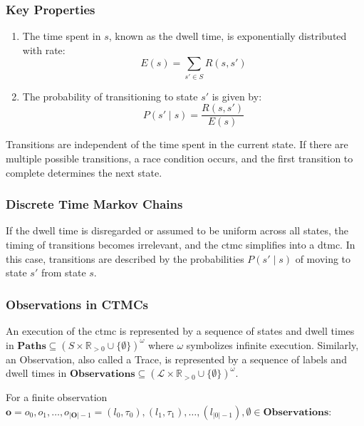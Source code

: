 \subsubsection{Key Properties}

\begin{enumerate}
    \item The time spent in $s$, known as the dwell time, is exponentially distributed with rate:
    \begin{equation}
        E(s) = \sum_{s' \in S} R(s, s')\label{eq:exitrate}
    \end{equation}
    \item The probability of transitioning to state $s'$ is given by:
    \begin{equation}
        P(s' \mid s) = \frac{R(s, s')}{E(s)}\label{eq:transition-probability}
    \end{equation}
\end{enumerate}


Transitions are independent of the time spent in the current state.
If there are multiple possible transitions, a race condition occurs, and the first transition to complete determines the next state.


\subsubsection{Discrete Time Markov Chains}
If the dwell time is disregarded or assumed to be uniform across all states, the timing of transitions becomes irrelevant, and the \gls{ctmc} simplifies into a \gls{dtmc}.
In this case, transitions are described by the probabilities $P(s' \mid s)$ of moving to state $s'$ from state $s$.

\subsubsection{Observations in CTMCs}
An execution of the \gls{ctmc} is represented by a sequence of states and dwell times in $\textbf{Paths} \subseteq (S \times \mathbb{R}_{>0} \cup \{\emptyset\})^{\omega}$ where $\omega$ symbolizes infinite execution.
Similarly, an Observation, also called a Trace, is represented by a sequence of labels and dwell times in $\textbf{Observations} \subseteq (\mathcal{L} \times \mathbb{R}_{>0} \cup \{\emptyset\})^{\omega}$.

For a finite observation $\textbf{o} = o_0, o_1, \dots, o_{|\textbf{O}|-1} = (l_0,\tau_0),(l_1,\tau_1),\dots,(l_{|0|-1}), \emptyset \in \textbf{Observations}$:

